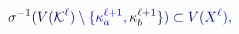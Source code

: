 \documentclass[12pt]{article}
\begin{document}
\makeatletter
\renewcommand*{\@textcolor}[3]{%
  \protect\leavevmode
  \begingroup
    \color#1{#2}#3%
  \endgroup
}
\makeatother
\begin{displaymath}
\mathcolor[RGB]{0,0,15}{\sigma} ^ { \mathcolor[RGB]{0,0,30}{-} \mathcolor[RGB]{0,0,45}{1} } \mathcolor[RGB]{0,0,60}{(} \mathcolor[RGB]{0,0,75}{V} \mathcolor[RGB]{0,0,90}{(} \mathcal { \mathcolor[RGB]{0,0,105}{K} } ^ { \mathcolor[RGB]{0,0,120}{\ell} } \mathcolor[RGB]{0,0,135}{)} \mathcolor[RGB]{0,0,150}{\setminus} \mathcolor[RGB]{0,0,165}{\{} \mathcolor[RGB]{0,0,180}{\kappa} _ { \mathcolor[RGB]{0,0,195}{a} } ^ { \mathcolor[RGB]{0,0,210}{\ell} \mathcolor[RGB]{0,0,225}{+} \mathcolor[RGB]{0,0,240}{1} } \mathcolor[RGB]{0,0,255}{,} \mathcolor[RGB]{0,15,0}{\kappa} _ { \mathcolor[RGB]{0,15,15}{b} } ^ { \mathcolor[RGB]{0,15,30}{\ell} \mathcolor[RGB]{0,15,45}{+} \mathcolor[RGB]{0,15,60}{1} } \mathcolor[RGB]{0,15,75}{\}} \mathcolor[RGB]{0,15,90}{)} \mathcolor[RGB]{0,15,105}{\subset} \mathcolor[RGB]{0,15,120}{V} \mathcolor[RGB]{0,15,135}{(} \mathcolor[RGB]{0,15,150}{X} ^ { \mathcolor[RGB]{0,15,165}{\ell} } \mathcolor[RGB]{0,15,180}{)} \mathcolor[RGB]{0,15,195}{,}
\end{displaymath}
\end{document}
